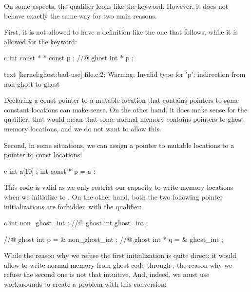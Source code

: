 

On some aspects, the  qualifier
looks like the  keyword. However, it does not
behave exactly the same way for two main reasons.


First, it is not allowed to have a definition like the one that
follows, while it is allowed for the  keyword:


\begin{CodeBlock}{c}
int const * * const p ;
//@ ghost int \ghost * * p ;
\end{CodeBlock}


\begin{CodeBlock}{text}
[kernel:ghost:bad-use] file.c:2: Warning:
  Invalid type for 'p': indirection from non-ghost to ghost
\end{CodeBlock}


Declaring a const pointer to a mutable location that contains pointers
to some constant locations can make sense. On the other hand, it does
make sense for the  qualifier, that
would mean that some normal memory contains pointers to ghost memory
locations, and we do not want to allow this.


Second, in some situations, we can assign a pointer to mutable locations
to a pointer to const locations:


\begin{CodeBlock}{c}
int a[10] ;
int const * p = a ;
\end{CodeBlock}


This code is valid as we only restrict our capacity to write memory
locations when we initialize  to .
On the other hand, both the two following pointer initializations
are forbidden with the  qualifier:


\begin{CodeBlock}{c}
int non_ghost_int ;
//@ ghost int ghost_int ;

//@ ghost int \ghost * p = & non_ghost_int ;
//@ ghost int * q = & ghost_int ;
\end{CodeBlock}


While the reason why we refuse the first initialization is quite direct:
it would allow to write normal memory from ghost code through
, the reason why we refuse the second one is not that
intuitive. And, indeed, we must use workarounds to create a problem with
this conversion:


